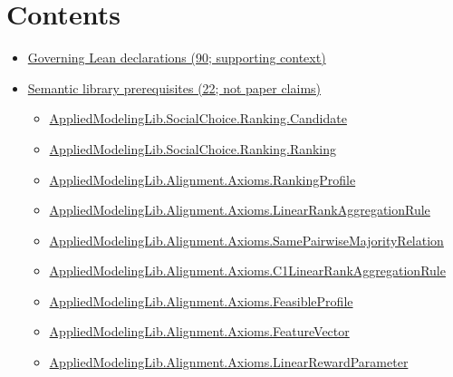 \documentclass[10pt]{article}
\begin{document}
\section*{Contents}
\begin{itemize}[leftmargin=1.2em]
\item \hyperlink{governing-declaration-section-5ef5ef0364b6939c}{Governing Lean declarations (90; supporting context)}
\item \hyperlink{library-section-8af29e4f263f1bc2}{Semantic library prerequisites (22; not paper claims)}
\begin{itemize}[leftmargin=1.2em]
\item \hyperlink{library-prerequisite-8c0e6c25845ae78a}{Applied\allowbreak{}Modeling\allowbreak{}Lib.\allowbreak{}Social\allowbreak{}Choice.\allowbreak{}Ranking.\allowbreak{}Candidate}
\item \hyperlink{library-prerequisite-5cde54446d1ae021}{Applied\allowbreak{}Modeling\allowbreak{}Lib.\allowbreak{}Social\allowbreak{}Choice.\allowbreak{}Ranking.\allowbreak{}Ranking}
\item \hyperlink{library-prerequisite-9bded048a60dfe0a}{Applied\allowbreak{}Modeling\allowbreak{}Lib.\allowbreak{}Alignment.\allowbreak{}Axioms.\allowbreak{}Ranking\allowbreak{}Profile}
\item \hyperlink{library-prerequisite-43447e121a1884f9}{Applied\allowbreak{}Modeling\allowbreak{}Lib.\allowbreak{}Alignment.\allowbreak{}Axioms.\allowbreak{}Linear\allowbreak{}Rank\allowbreak{}Aggregation\allowbreak{}Rule}
\item \hyperlink{library-prerequisite-8feb80e31f32c9f1}{Applied\allowbreak{}Modeling\allowbreak{}Lib.\allowbreak{}Alignment.\allowbreak{}Axioms.\allowbreak{}Same\allowbreak{}Pairwise\allowbreak{}Majority\allowbreak{}Relation}
\item \hyperlink{library-prerequisite-e72857a369826fa4}{Applied\allowbreak{}Modeling\allowbreak{}Lib.\allowbreak{}Alignment.\allowbreak{}Axioms.\allowbreak{}C1\allowbreak{}Linear\allowbreak{}Rank\allowbreak{}Aggregation\allowbreak{}Rule}
\item \hyperlink{library-prerequisite-5fa7bdb49b050adf}{Applied\allowbreak{}Modeling\allowbreak{}Lib.\allowbreak{}Alignment.\allowbreak{}Axioms.\allowbreak{}Feasible\allowbreak{}Profile}
\item \hyperlink{library-prerequisite-a0b67c6a143b0b13}{Applied\allowbreak{}Modeling\allowbreak{}Lib.\allowbreak{}Alignment.\allowbreak{}Axioms.\allowbreak{}Feature\allowbreak{}Vector}
\item \hyperlink{library-prerequisite-d58203ca3f4a8c05}{Applied\allowbreak{}Modeling\allowbreak{}Lib.\allowbreak{}Alignment.\allowbreak{}Axioms.\allowbreak{}Linear\allowbreak{}Reward\allowbreak{}Parameter}

\end{itemize}
\end{itemize}
\end{document}

